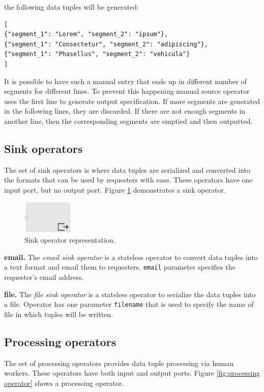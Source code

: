 \noindent the following data tuples will be generated:

\begin{lstlisting}
[
{"segment_1": "Lorem", "segment_2": "ipsum"},
{"segment_1": "Consectetur", "segment_2": "adipiscing"},
{"segment_1": "Phasellus", "segment_2": "vehicula"}
]
\end{lstlisting}

It is possible to have such a manual entry that ends up in different number of segments 
for different lines. To prevent this happening manual source operator uses the first line 
to generate output specification. If more segments are generated in the following lines, 
they are discarded. If there are not enough segments in another line, then the corresponding 
segments are emptied and then outputted.

\subsection{Sink operators}
The set of sink operators is where data tuples are serialized and converted into 
the formats that can be used by requesters with ease. These operators have one 
input port, but no output port. Figure \ref{fig:sink operator} demonstrates a sink operator.

\begin{figure}[ht]
	\centering
	\includegraphics[height=60px]{figures/SinkOperator.pdf}
	\caption{Sink operator representation.}
	\label{fig:sink operator}
\end{figure}

\textbf{email.}
The \textit{email sink operator} is a stateless operator to convert data tuples into a 
text format and email them to requesters. \texttt{email} parameter specifies the 
requester's email address. 

\textbf{file.}
The \textit{file sink operator} is a stateless operator to serialize the data tuples into 
a file. Operator has one parameter \texttt{filename} that is used to specify the name 
of file in which tuples will be written.

\subsection{Processing operators}
The set of processing operators provides data tuple processing via human workers. 
These operators have both input and output ports. Figure \ref{fig:processing operator} 
shows a processing operator.


